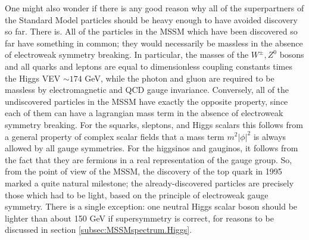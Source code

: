 One might also wonder if there is any good reason why all of
the superpartners of the Standard Model particles should be
heavy enough to have avoided discovery so far. There is.
All of the particles in the MSSM which have been discovered so far have
something in common; they would necessarily be massless in the absence of
electroweak symmetry breaking. In particular, the masses of the
$W^\pm, Z^0$ bosons and all quarks and leptons are equal to
dimensionless coupling constants times the Higgs VEV $\sim 174 $ GeV,
while the photon and gluon are required to be massless by electromagnetic
and QCD gauge invariance. Conversely, all of the undiscovered particles
in the MSSM have exactly the opposite property, since each of them can
have a lagrangian mass term in the absence of
electroweak symmetry breaking.
For the squarks, sleptons, and Higgs scalars this follows from a general
property of complex scalar fields that a mass term $m^2 |\phi|^2$
is always allowed by all gauge symmetries. For the higgsinos and gauginos,
it follows from the fact that they are fermions in a real representation
of the
gauge group. So, from the point of view of the MSSM, the discovery
of the top quark in 1995 marked a quite natural milestone; the
already-discovered particles are precisely those which had to
be light, based on the principle of electroweak gauge symmetry.
There is a single exception: one neutral Higgs scalar boson
should be lighter than about 150 GeV if supersymmetry
is correct, for reasons to be discussed in section
\ref{subsec:MSSMspectrum.Higgs}.

